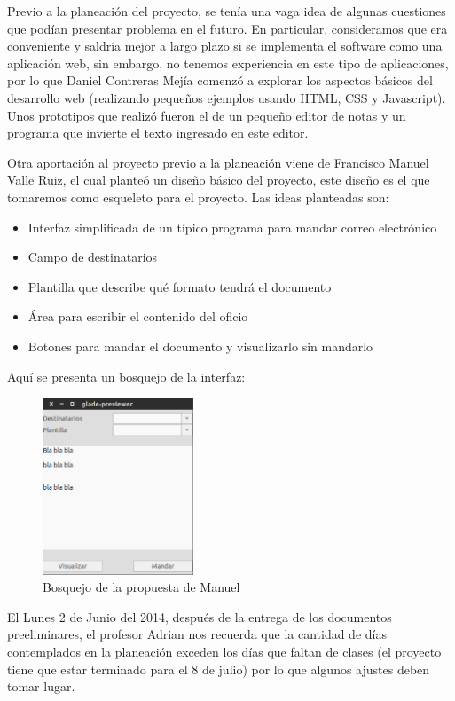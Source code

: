 \documentclass[letterpaper]{article}
\begin{document}
Previo a la planeación del proyecto, se tenía una vaga idea de algunas cuestiones que podían presentar problema en el futuro. En particular, consideramos que era conveniente y saldría mejor a largo plazo si se implementa el software como una aplicación web, sin embargo, no tenemos experiencia en este tipo de aplicaciones, por lo que Daniel Contreras Mejía comenzó a explorar los aspectos básicos del desarrollo web (realizando pequeños ejemplos usando HTML, CSS y Javascript). Unos prototipos que realizó fueron el de un pequeño editor de notas y un programa que invierte el texto ingresado en este editor.

Otra aportación al proyecto previo a la planeación viene de Francisco Manuel Valle Ruiz, el cual planteó un diseño básico del proyecto, este diseño es el que tomaremos como esqueleto para el proyecto. Las ideas planteadas son:

\begin{itemize}
\item Interfaz simplificada de un típico programa para mandar correo electrónico
\item Campo de destinatarios
\item Plantilla que describe qué formato tendrá el documento
\item Área para escribir el contenido del oficio
\item Botones para mandar el documento y visualizarlo sin mandarlo
\end{itemize}

Aquí se presenta un bosquejo de la interfaz:

\begin{figure}[h!]
  \centering
    \includegraphics[width=0.4\textwidth]{graphics/sketch_ui.png}
    \caption{Bosquejo de la propuesta de Manuel}
\end{figure}

El Lunes 2 de Junio del 2014, después de la entrega de los documentos preeliminares, el profesor Adrian nos recuerda que la cantidad de días contemplados en la planeación exceden los días que faltan de clases (el proyecto tiene que estar terminado para el 8 de julio) por lo que algunos ajustes deben tomar lugar.
\end{document}
